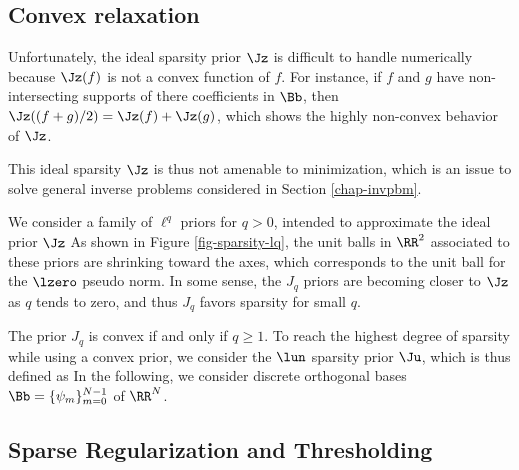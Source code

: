 

\subsection{Convex relaxation}

Unfortunately, the ideal sparsity prior $\Jz$ is difficult to handle numerically because $\Jz(f)$ is not a convex function of $f$. For instance, if $f$ and $g$ have non-intersecting supports of there coefficients in $\Bb$, then $\Jz( (f+g)/2 ) = \Jz(f)+\Jz(g)$, which shows the highly non-convex behavior of $\Jz$.

This ideal sparsity $\Jz$ is thus not amenable to minimization, which is an issue to solve general inverse problems considered in Section \ref{chap-invpbm}. 

We consider a family of $\ell^q$ priors for $q>0$, intended to approximate the ideal prior $\Jz$ 
As shown in Figure \ref{fig-sparsity-lq}, the unit balls in $\RR^2$ associated to these priors are shrinking toward the axes, which corresponds to the unit ball for the $\lzero$ pseudo norm. In some sense, the $J_q$ priors are becoming closer to $\Jz$ as $q$ tends to zero, and thus $J_q$ favors sparsity for small $q$.




The prior $J_q$ is convex if and only if $q \geq 1$. To reach the highest degree of sparsity while using a convex prior, we consider the $\lun$ sparsity prior $\Ju$, which is thus defined as 
In the following, we consider discrete orthogonal bases $\Bb = \{\psi_m\}_{m=0}^{N-1}$ of $\RR^N$.


\subsection{Sparse Regularization and Thresholding}

